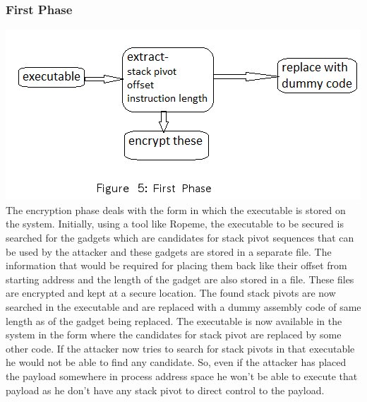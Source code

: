 \documentclass{article}
\begin{document}
\begin{multicols}{2}
	\subsubsection{First Phase}
	\includegraphics[scale=.5]{phase1.png}\break
	The encryption phase deals with the form in which the executable is stored on the system. Initially, using a tool like Ropeme\cite{ropeme}, the executable to be secured is searched for the gadgets which are candidates for stack pivot sequences that can be used by the attacker and these gadgets are stored in a separate file. The information that would be required for placing them back like their offset from starting address and the length of the gadget are also stored in a file. These files are encrypted and kept at a secure location. The found stack pivots are now searched in the executable and are replaced with a dummy assembly code of same length as of the gadget being replaced. The executable is now available in the system in the form where the candidates for stack pivot are replaced by some other code. If the attacker now tries to search for stack pivots in that executable he would not be able to find any candidate. So, even if the attacker has placed the payload somewhere in process address space he won't be able to execute that payload as he don't have any stack pivot to direct control to the payload.
	

\end{multicols}
\end{document}

